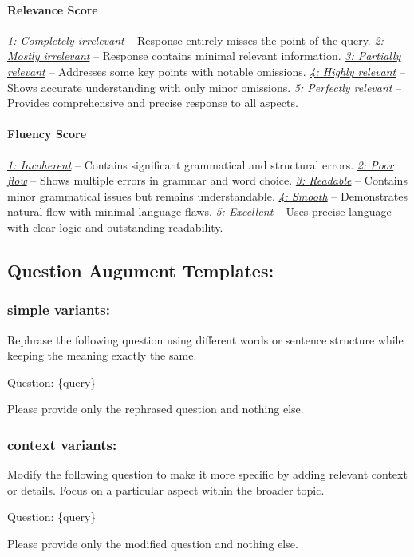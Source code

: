 \paragraph{Relevance Score}
\underline{\textit{1: Completely irrelevant}} -- Response entirely misses the point of the query.
\underline{\textit{2: Mostly irrelevant}} -- Response contains minimal relevant information.
\underline{\textit{3: Partially relevant}} -- Addresses some key points with notable omissions.
\underline{\textit{4: Highly relevant}} -- Shows accurate understanding with only minor omissions.
\underline{\textit{5: Perfectly relevant}} -- Provides comprehensive and precise response to all aspects.
\paragraph{Fluency Score}
\underline{\textit{1: Incoherent}} -- Contains significant grammatical and structural errors.
\underline{\textit{2: Poor flow}} -- Shows multiple errors in grammar and word choice.
\underline{\textit{3: Readable}} -- Contains minor grammatical issues but remains understandable.
\underline{\textit{4: Smooth}} -- Demonstrates natural flow with minimal language flaws.
\underline{\textit{5: Excellent}} -- Uses precise language with clear logic and outstanding readability.

\subsection{Question Augument Templates:}
\subsubsection{simple variants:}
\begin{tcolorbox}[
    breakable,
    colback=white,
    colframe=gray!60,
    boxrule=0.3pt,
    top=6pt,
    bottom=6pt,
    left=8pt,
    right=8pt,
    fontupper=\small,
]
Rephrase the following question 
using different words or sentence 
structure while keeping the meaning 
exactly the same.

Question:
\{query\}

Please provide only the 
rephrased question and nothing else.
\end{tcolorbox}
\subsubsection{context variants:}
\begin{tcolorbox}[
    breakable,
    colback=white,
    colframe=gray!60,
    boxrule=0.3pt,
    top=6pt,
    bottom=6pt,
    left=8pt,
    right=8pt,
    fontupper=\small,
]
Modify the following question to make 
it more specific by adding relevant 
context or details. Focus on a 
particular aspect within the broader 
topic.

Question:
\{query\}

Please provide only the modified question and nothing else.
\end{tcolorbox}
